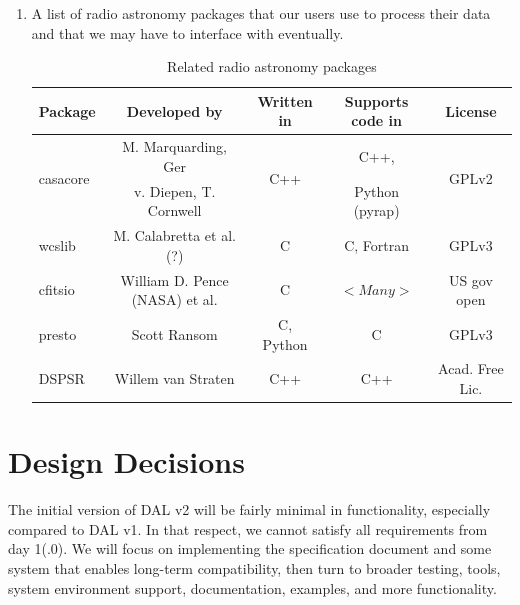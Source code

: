 \documentclass[a4paper,11pt]{article}
\begin{document}
\begin{enumerate}[label=\it E.\arabic{*}]
\item \label{env:radio_astro_pkgs} A list of radio astronomy packages that our users use to process their data and that we may have to interface with eventually.
\begin{table}[htb!]
\centering
\begin{tabular}{lcccc}
\toprule
Package					& Developed by			& Written in		& Supports code in	& License \\
\midrule
\multirow{2}{*}{casacore\footnotemark}	& M. Marquarding, Ger		& \multirow{2}{*}{C++}	& C++,			& \multirow{2}{*}{GPLv2} \\
					& v. Diepen, T. Cornwell	&			& Python (pyrap)	& \\
wcslib\footnotemark			& M. Calabretta et al.(?)	& C			& C, Fortran		& GPLv3	\\
cfitsio\footnotemark			& William D. Pence (NASA) et al.& C			& $<Many>$		& US gov open\\
presto\footnotemark		& Scott Ransom			& C, Python			& C					& GPLv3 \\
DSPSR\footnotemark		& Willem van Straten	& C++				& C++				& Acad. Free Lic.\\

\bottomrule
\end{tabular}
\caption{Related radio astronomy packages}
\end{table}
\addtocounter{footnote}{-5}	%

\end{enumerate}



\section{Design Decisions} \label{sec:design_decisions}
The initial version of DAL v2 will be fairly minimal in functionality, especially compared to DAL v1.
In that respect, we cannot satisfy all requirements from day 1(.0).
We will focus on implementing the specification document and some system that enables long-term compatibility, then turn to broader testing, tools, system environment support, documentation, examples, and more functionality.
\end{document}
